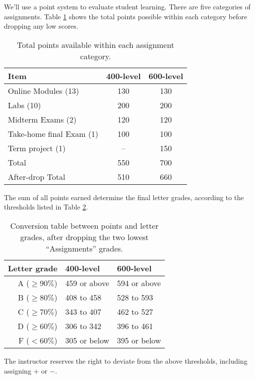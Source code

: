 \documentclass[11pt,onecolumn]{article}
\begin{document}
We'll use a point system to evaluate student learning. There are five categories of assignments. Table \ref{tab:points} shows the total points possible within each category before dropping any low scores.

\begin{table}[h]
  \begin{center}
  \begin{tabular}{l|c|c}	%
Item&400-level& 600-level\\\hline\hline
    Online Modules (13)& 130 & 130\\
    Labs (10)& 200 & 200 \\
  Midterm Exams (2) & 120 & 120\\
  Take-home final Exam (1)& 100 & 100\\
    Term project (1)&-- & 150 \\
    \hline
    Total &550 & 700 \\
    After-drop Total &510 & 660 \\
  \end{tabular}
  \caption{Total points available within each assignment category. \label{tab:points}}
\end{center}

\end{table}

The sum of all points earned determine the final letter grades, according to the thresholds listed in Table \ref{tab:grade}.

\begin{table}[h]
\begin{center}
  \begin{tabular}{r|l|l}
    Letter grade &400-level& 600-level\\\hline\hline
A ($\geq 90\%$)&459 or above&594 or above\\
B ($\geq 80\%$)&408 to 458&528 to 593\\
C ($\geq 70\%$)&343 to 407&462 to 527\\
D ($\geq 60\%$)&306 to 342&396 to 461\\
F ($< 60\%$)&305 or below&395 or below
  \end{tabular}
  \caption{Conversion table between points and letter grades, after dropping the two lowest ``Assignments'' grades.\label{tab:grade}}
\end{center}

\end{table}

The instructor reserves the right to deviate from the above thresholds, including assigning $+$ or $-$.
\end{document}
